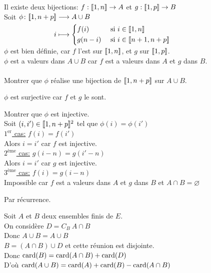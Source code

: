 \documentclass[12pt,twoside,a4paper]{article}
\begin{document}
	\begin{preuve}
		Il existe deux bijections: $f:[\![ 1,n]\!]\rightarrow A$ et $g:[\![ 1,p]\!]\rightarrow B$\\
		Soit $\begin{aligned}[t]\phi\colon[\![ 1,n+p]\!]&\longrightarrow A\cup B \\i&\longmapsto\left\{
			\begin{aligned}
			& f(i) & \text{ si } & i\in[\![ 1,n]\!]\\
			& g(n-i) & \text{ si } & i\in [\![ n+1,n+p]\!]
			\end{aligned}\right.\end{aligned}$\\
		$\phi$ est bien d\'efinie, car $f$ l'est sur $[\![ 1,n]\!]$, et $g$ sur $[\![ 1,p]\!]$.\\
		$\phi$ est a valeurs dans $A\cup B$ car $f$ est a valeurs dans $A$ et $g$ dans $B$.\\
		\\
		Montrer que $\phi$ r\'ealise une bijection de $[\![ 1,n+p]\!]$ sur $A\cup B$.
		\begin{liste}
			\item $\phi$ est surjective car $f$ et $g$ le sont.
			\item Montrer que $\phi$ est injective.\\
				Soit $(i,i')\in [\![ 1,n+p]\!]^{2}$ tel que $\phi(i)=\phi(i')$\\
				\underline{$1^{\text{er}}$ cas:} $f(i)=f(i')$\\
				Alors $i=i'$ car $f$ est injective.\\
				\underline{$2^{\text{\`eme}}$ cas:} $g(i-n)=g(i'-n)$\\
				Alors $i=i'$ car $g$ est injective.\\
				\underline{$3^{\text{\`eme}}$ cas:} $f(i)=g(i-n)$\\
				Impossible car $f$ est a valeurs dans $A$ et $g$ dans $B$ et $A\cap B=\varnothing$
		\end{liste}
	\end{preuve}
	\begin{preuve}
		Par r\'ecurrence.
	\end{preuve}
	\begin{preuve}
		Soit $A$ et $B$ deux ensembles finis de $E$.\\
		On consid\`ere $D=C_B\ A\cap B$\\
		Donc $A\cup B=A\cup B$\\
		$B=(A\cap B)\cup D$ et cette r\'eunion est disjointe.\\
		Donc $\text{card}(B)=\text{card}(A\cap B)+\text{card}(D)$\\
		D'o\`u $\text{card}(A\cup B)=\text{card}(A)+\text{card}(B)-\text{card}(A\cap B)$
	\end{preuve}
\end{document}
